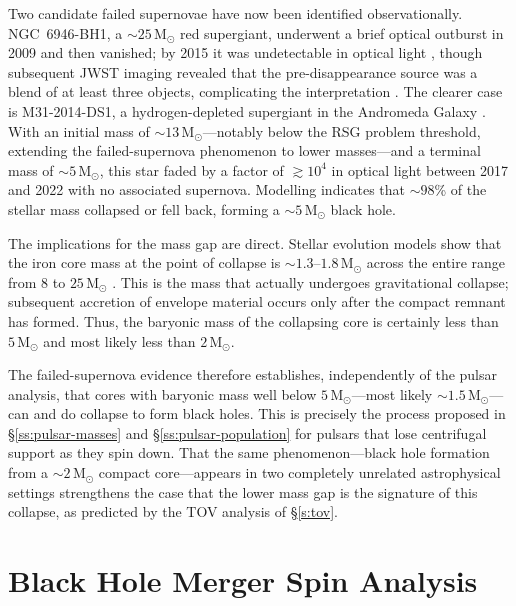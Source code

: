 \documentclass[manuscript,linenumbers]{aastex701}
\newcommand{\Msun}{\mathrm{M}_\odot}
\begin{document}
Two candidate failed supernovae have now been identified
observationally.  NGC~6946-BH1, a ${\sim}25\,\Msun$ red
supergiant, underwent a brief optical outburst in 2009 and then
vanished; by 2015 it was undetectable in optical light
\citep{Adams2017}, though subsequent JWST imaging revealed that the
pre-disappearance source was a blend of at least three objects,
complicating the interpretation \citep{Beasor2024}.  The clearer
case is M31-2014-DS1, a hydrogen-depleted supergiant in the
Andromeda Galaxy \citep{De2026}.  With an initial mass of
${\sim}13\,\Msun$---notably below the RSG problem threshold,
extending the failed-supernova phenomenon to lower masses---and a
terminal mass of ${\sim}5\,\Msun$, this star faded by a factor
of $\gtrsim\!10^{4}$ in optical light between 2017 and 2022 with no
associated supernova.  Modelling indicates that ${\sim}98$\% of the
stellar mass collapsed or fell back, forming a
${\sim}5\,\Msun$ black hole.

The implications for the mass gap are direct.  Stellar evolution
models show that the iron core mass at the point of collapse is
${\sim}1.3$--$1.8\,\Msun$ across the entire range from 8 to
$25\,\Msun$ \citep{WoosleyHegerWeaver2002, Sukhbold2016}.  This is the
mass that actually undergoes gravitational collapse; subsequent
accretion of envelope material occurs only after the compact remnant
has formed.  Thus, the baryonic mass of the collapsing core is
certainly less than $5\,\Msun$ and most likely less than $2\,\Msun$.

The failed-supernova evidence therefore establishes, independently
of the pulsar analysis, that cores with baryonic mass well below
$5\,\Msun$---most likely ${\sim}1.5\,\Msun$---can and do
collapse to form black holes.  This is precisely the process
proposed in \S\ref{ss:pulsar-masses} and \S\ref{ss:pulsar-population}
for pulsars that lose centrifugal support as they spin down.  That
the same phenomenon---black hole formation from a
${\sim}2\,\Msun$ compact core---appears in two completely
unrelated astrophysical settings strengthens the case that the
lower mass gap is the signature of this collapse, as predicted by
the TOV analysis of \S\ref{s:tov}.

\section{Black Hole Merger Spin Analysis}\label{s:gwtc}
\end{document}
